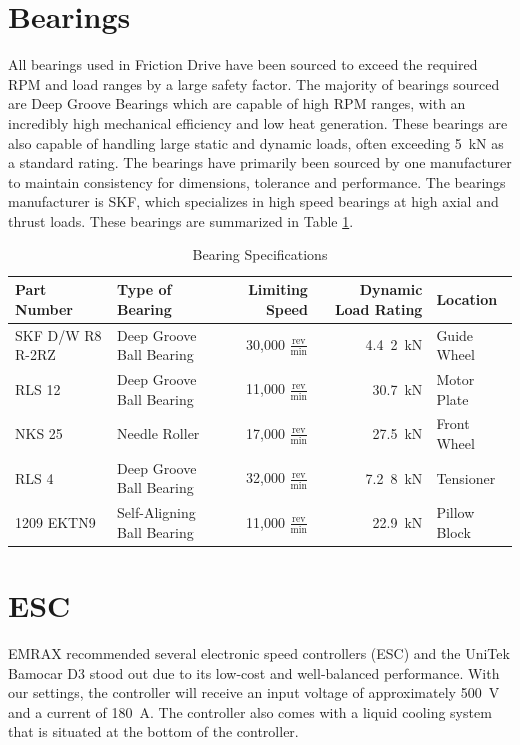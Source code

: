 \documentclass[main.tex]{subfiles}
\begin{document}
\section{Bearings}
All bearings used in Friction Drive have been sourced to exceed the required RPM and load ranges by a large safety factor. The majority of bearings sourced are Deep Groove Bearings which are capable of high RPM ranges, with an incredibly high mechanical efficiency and low heat generation. These bearings are also capable of handling large static and dynamic loads, often exceeding \SI{5}{kN} as a standard rating. The bearings have primarily been sourced by one manufacturer to maintain consistency for dimensions, tolerance and performance. The bearings manufacturer is SKF, which specializes in high speed bearings at high axial and thrust loads. These bearings are summarized in Table \ref{table:bearingtable}.\\

\begin{table}
\centering
  \begin{tabular}{@{}l l r r l@{}} \toprule
    Part Number & Type of Bearing & Limiting Speed & Dynamic Load Rating & Location \\ \midrule
    SKF D/W R8 R-2RZ & Deep Groove Ball Bearing & 30,000 $\frac{\mathrm{rev}}{\mathrm{min}}$ & \SI{4.4}2{kN} & Guide Wheel\\
    RLS 12 & Deep Groove Ball Bearing& 11,000 $\frac{\mathrm{rev}}{\mathrm{min}}$ & \SI{30.7}{kN} & Motor Plate\\
    NKS 25 & Needle Roller & 17,000 $\frac{\mathrm{rev}}{\mathrm{min}}$ & \SI{27.5}{kN} & Front Wheel\\
    RLS 4 & Deep Groove Ball Bearing & 32,000 $\frac{\mathrm{rev}}{\mathrm{min}}$ & \SI{7.2}8{kN} & Tensioner \\
    1209 EKTN9 & Self-Aligning Ball Bearing & 11,000 $\frac{\mathrm{rev}}{\mathrm{min}}$ & \SI{22.9}{kN} & Pillow Block \\  \bottomrule
  \end{tabular}
  \caption{Bearing Specifications}
  \label{table:bearingtable}
\end{table}

    \section{ESC}
    EMRAX recommended several electronic speed controllers (ESC) and the UniTek Bamocar D3 stood out due to its low-cost and well-balanced performance. With our settings, the controller will receive an input voltage of approximately \SI{500}{V} and a current of \SI{180}{A}. The controller also comes with a liquid cooling system that is situated at the bottom of the controller.\\
\end{document}
